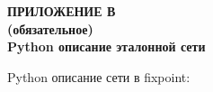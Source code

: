 {}%
\par

\normalsize
\begin{center}
  \textbf{ПРИЛОЖЕНИЕ В} \\
  \textbf{(обязательное)} \\
  \textbf{Python описание эталонной сети}
\end{center}

Python описание сети в fixpoint:



\pdfpagewidth=210mm
\pdfpageheight=297mm